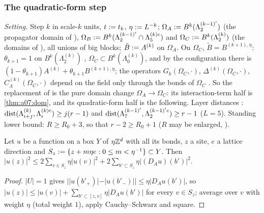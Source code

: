 
\subsubsection*{The quadratic-form step \cite[(2.108)--(2.109)]{Ba2}}

\emph{Setting.} Step $k$ in scale-$k$ units, $t:= t_k$, $\eta:= L^{-k}$; $\Omega_A:= B^k(\Lambda^{(k-1)'}_2)$ (the propagator domain of \cite[(2.53), (2.56)]{Ba2}), $\Omega_B:= B^k(\Lambda^{(k-1)'}_2\cap\Lambda^{(k)c}_5)$ and $\Omega_C:= B^k(\Lambda^{(k)}_2)$ (the domains of \cite[(2.108)]{Ba2}), all unions of big blocks; $\tilde B:= A^{(k)}$ on $\Omega_A$. On $\Omega_C$, $\tilde B=B^{(k+1),\eta}$: $\theta_{k+1}=1$ on $B^k(\Lambda^{(k)}_2)$ \cite[pp.~567, 576]{Ba2}, $\Omega_C\subset B^k(\Lambda^{(k)}_0)$, and by \cite[p.~579]{Ba2} the configuration there is $(1-\theta_{k+1})A^{(k)}+\theta_{k+1}B^{(k+1),\eta}$; the operators $G_k(\Omega_C,\cdot)$, $\Delta^{(k)}(\Omega_C,\cdot)$, $C^{(k)}_\Lambda(\Omega_C,\cdot)$ depend on the field only through the bonds of $\Omega_C$ \cite[(1.3)--(1.4)]{Ba4}. So the replacement of \cite[Prop.~2.6]{Ba2} is the pure domain change $\Omega_A\to\Omega_C$: its interaction-term half is \cref{thm:a07:dom}, and its quadratic-form half is the following. Layer distances \cite[(2.8)]{Ba2}: $\operatorname{dist}(\Lambda^{(k)}_{i+j},\Lambda^{(k)c}_i)\ge j(r-1)$ and $\operatorname{dist}(\Lambda^{(k-1)'}_7,\Lambda^{(k-1)'c}_2)\ge r-1$ ($L=5$). Standing lower bound: $R\ge R_0+3$, so that $r-2\ge R_0+1$ ($R$ may be enlarged, \cite[(2.7)]{Ba2}).

\begin{lemma}\label{lem:a06f:T}
Let $u$ be a function on a box $Y$ of $\eta\mathbb Z^d$ with all its bonds, $z$ a site, $e$ a lattice direction and $S_z:=\{z+m\eta e:0\le m<\eta^{-1}\}\subset Y$. Then $|u(z)|^2\le2\sum_{v\in S_z}\eta|u(v)|^2+2\sum_{b'\subset S_z}\eta|(D_Au)(b')|^2$.
\end{lemma}

\begin{proof}
$|U|=1$ gives $||u(b'_+)|-|u(b'_-)||\le\eta|D_Au(b')|$, so $|u(z)|\le|u(v)|+\sum_{b'\subset[z,v]}\eta|D_Au(b')|$ for every $v\in S_z$; average over $v$ with weight $\eta$ (total weight $1$), apply Cauchy--Schwarz and square.
\end{proof}

